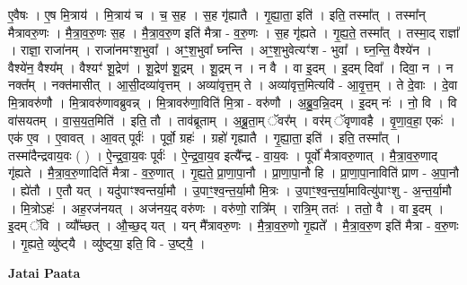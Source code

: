 \documentclass[17pt]{extarticle}
\begin{document}
ए॒वैषः । ए॒ष मि॒त्राय॑ । मि॒त्राय॑ च । च॒ स॒ह । स॒ह गृ॑ह्यातै । गृ॒ह्या॒ता॒ इति॑ । इति॒ तस्मा᳚त् । तस्मा᳚न् मैत्रावरु॒णः । मै॒त्रा॒व॒रु॒णः स॒ह । मै॒त्रा॒व॒रु॒ण इति॑ मैत्रा - व॒रु॒णः । स॒ह गृ॑ह्यते । गृ॒ह्य॒ते॒ तस्मा᳚त् । तस्मा॒द् राज्ञा᳚ । राज्ञा॒ राजा॑नम् । राजा॑नमꣳश॒भुवा᳚ । अꣳ॒॒श॒भुवा᳚ घ्नन्ति । अꣳ॒॒श॒भुवेत्यꣳ॑श - भुवा᳚ । घ्न॒न्ति॒ वैश्ये॑न । वैश्ये॑न॒ वैश्य᳚म् । वैश्यꣳ॑ शू॒द्रेण॑ । शू॒द्रेण॑ शू॒द्रम् । शू॒द्रम् न । न वै । वा इ॒दम् । इ॒दम् दिवा᳚ । दिवा॒ न । न नक्त᳚म् । नक्त॑मासीत् । आ॒सी॒दव्या॑वृत्तम् । अव्या॑वृत्त॒म् ते । अव्या॑वृत्त॒मित्यवि॑ - आ॒वृ॒त्त॒म् । ते दे॒वाः । दे॒वा मि॒त्रावरु॑णौ । मि॒त्रावरु॑णावब्रुवन्न् । मि॒त्रावरु॑णा॒विति॑ मि॒त्रा - वरु॑णौ । अ॒ब्रु॒व॒न्नि॒दम् । इ॒दम् नः॑ । नो॒ वि । वि वा॑सयतम् । वा॒स॒य॒त॒मिति॑ । इति॒ तौ । ताव॑ब्रूताम् । अ॒ब्रू॒ता॒म् ॅवर᳚म् । वर॑म् ॅवृणावहै । वृ॒णा॒व॒हा॒ एकः॑ । एक॑ ए॒व । ए॒वावत् । आ॒वत् पूर्वः॑ । पूर्वो॒ ग्रहः॑ । ग्रहो॑ गृह्यातै । गृ॒ह्या॒ता॒ इति॑ । इति॒ तस्मा᳚त् । तस्मा॑दैन्द्रवाय॒वः ( ) । ऐ॒न्द्र॒वा॒य॒वः पूर्वः॑ । ऐ॒न्द्र॒वा॒य॒व इत्यै᳚न्द्र - वा॒य॒वः । पूर्वो॑ मैत्रावरु॒णात् । मै॒त्रा॒व॒रु॒णाद् गृ॑ह्यते । मै॒त्रा॒व॒रु॒णादिति॑ मैत्रा - व॒रु॒णात् । गृ॒ह्य॒ते॒ प्रा॒णा॒पा॒नौ । प्रा॒णा॒पा॒नौ हि । प्रा॒णा॒पा॒नाविति॑ प्राण - अ॒पा॒नौ । ह्ये॑तौ । ए॒तौ यत् । यदु॑पाꣳश्वन्तर्या॒मौ । उ॒पाꣳ॒॒श्व॒न्त॒र्या॒मौ मि॒त्रः । उ॒पाꣳ॒॒श्व॒न्त॒र्या॒मावित्यु॑पाꣳशु - अ॒न्त॒र्या॒मौ । मि॒त्रोऽहः॑ । अह॒रज॑नयत् । अज॑नय॒द् वरु॑णः । वरु॑णो॒ रात्रि᳚म् । रात्रि॒म् ततः॑ । ततो॒ वै । वा इ॒दम् । इ॒दम् ॅवि । व्यौ᳚च्छत् । औ॒च्छ॒द् यत् । यन् मै᳚त्रावरु॒णः । मै॒त्रा॒व॒रु॒णो गृ॒ह्यते᳚ । मै॒त्रा॒व॒रु॒ण इति॑ मैत्रा - व॒रु॒णः । गृ॒ह्यते॒ व्यु॑ष्ट्‍यै । व्यु॑ष्ट्‍या॒ इति॒ वि - उ॒ष्ट्‍यै॒ । \newline

\textbf{Jatai Paata} \newline
\end{document}
